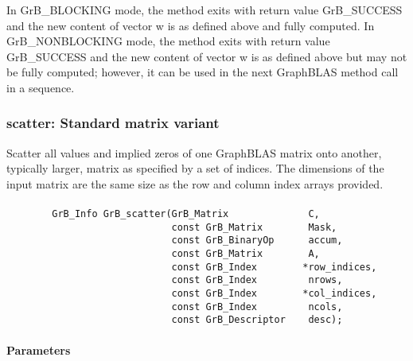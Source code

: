 In {\sf GrB\_BLOCKING} mode, the method exits with return value 
{\sf GrB\_SUCCESS} and the new content of vector {\sf w} is as defined above
and fully computed.  
In {\sf GrB\_NONBLOCKING} mode, the method exits with return value 
{\sf GrB\_SUCCESS} and the new content of vector {\sf w} is as defined above 
but may not be fully computed; however, it can be used in the next GraphBLAS 
method call in a sequence.


\subsubsection{{\sf scatter}: Standard matrix variant}

Scatter all values and implied zeros of one GraphBLAS matrix onto another,
typically larger, 
matrix as specified by a set of indices. The dimensions of the input matrix are
the same size as the row and column index arrays provided.

\paragraph{\syntax}

\begin{verbatim}
        GrB_Info GrB_scatter(GrB_Matrix              C,
                             const GrB_Matrix        Mask,
                             const GrB_BinaryOp      accum,
                             const GrB_Matrix        A,
                             const GrB_Index        *row_indices,
                             const GrB_Index         nrows,
                             const GrB_Index        *col_indices,
                             const GrB_Index         ncols,
                             const GrB_Descriptor    desc);
\end{verbatim}

\paragraph{Parameters}

